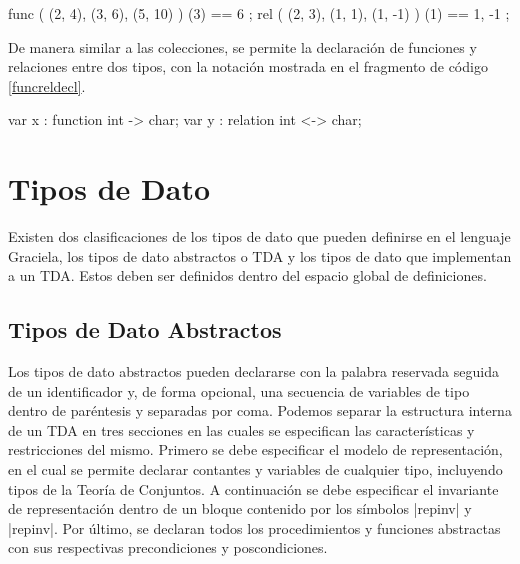 \begin{gracielacode}[caption=Evaluación de \textit{función} y \textit{relación}, label=lst:funcreleval]
{ func ({ (2, 4), (3, 6), (5, 10) }) (3) == 6 };
{ rel  ({ (2, 3), (1, 1), (1, -1) }) (1) == {1, -1} };
\end{gracielacode}

De manera similar a las colecciones, se permite la declaración de funciones y
relaciones entre dos tipos, con la notación mostrada en el fragmento de código
\ref{funcreldecl}.

\begin{gracielacode}[caption=Declaración de variables de tipos \textit{función} y \textit{relación}, label=lst:funcreldecl]
var x : function int -> char;
var y : relation int <-> char;
\end{gracielacode}

\section{Tipos de Dato}

Existen dos clasificaciones de los tipos de dato que pueden definirse en el
lenguaje Graciela, los tipos de dato abstractos o TDA y los tipos de dato que
implementan a un TDA. Estos deben ser definidos dentro del espacio global de
definiciones.

\subsection{Tipos de Dato Abstractos}

Los tipos de dato abstractos pueden declararse con la palabra reservada
 seguida de un identificador y, de forma opcional, una secuencia
de variables de tipo dentro de paréntesis y separadas por coma. Podemos separar
la estructura interna de un TDA en tres secciones en las cuales se especifican
las características y restricciones del mismo. Primero se debe especificar el
modelo de representación, en el cual se permite declarar contantes y variables
de cualquier tipo, incluyendo tipos de la Teoría de Conjuntos. A continuación se
debe especificar el invariante de representación dentro de un bloque contenido
por los símbolos \ingra|{repinv| y \ingra|repinv}|. Por último, se declaran
todos los procedimientos y funciones abstractas con sus respectivas
precondiciones y poscondiciones.

